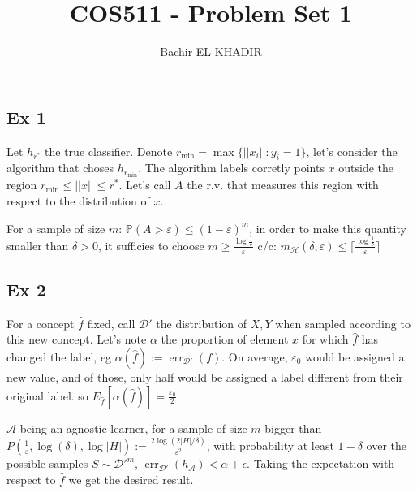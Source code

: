 \documentclass[12pt]{article}
\title{COS511 - Problem Set 1}
\author{Bachir EL KHADIR }
\newcommand{\Q}[1]{\subsection*{Ex #1}}
\newenvironment{question}[1]
{\Q{#1}}{}
\newcommand{\pr}{{\mathbb P}}
\DeclareMathOperator{\err}{err}
\begin{document}
\maketitle

\begin{question}{1}

Let $h_{r^*}$ the true classifier.
Denote $r_{\min} = \max \{ ||x_i|| : y_i = 1 \}$, let's consider the algorithm that choses $h_{r_{\min}}$.
The algorithm labels corretly points $x$ outside the region $r_{\min} \le ||x|| \le r^*$.
Let's call $A$ the r.v. that measures this region with respect to the distribution of $x$.

For a sample of size $m$: $\pr(A > \varepsilon) \le (1 - \varepsilon)^m$, in order to make this quantity smaller than $\delta > 0$, it sufficies to choose $m \ge \frac{\log \frac1\delta}{\varepsilon}
$
c/c: $m_{\mathcal H}(\delta, \varepsilon) \le \lceil \frac{\log \frac1\delta}{\varepsilon} \rceil$
\end{question}
\begin{question}{2}
For a concept $\hat f$ fixed, call $\mathcal D'$ the distribution of $X, Y$ when sampled according to this new concept. Let's note $\alpha$ the proportion of element $x$ for which $\hat f$ has changed the label, eg $\alpha(\hat f) := \err_{\mathcal D'}(f)$. On average, $\varepsilon_0$ would be assigned a new value, and of those, only half would be assigned a label different from their original label. so $E_{\hat f}[\alpha(\hat f)] = \frac{\varepsilon_0}2$

$\mathcal A$ being an agnostic learner, for a sample of size $m$ bigger than $P(\frac1\varepsilon, \log(\delta), \log|H|) := \frac{2 \log(2 |H| / \delta)}{\varepsilon^2}$, with probability at least $1 - \delta$ over the possible samples $S \sim \mathcal {D'}^m$, $\err_{\mathcal D'}(h_{\mathcal A}) < \alpha + \epsilon$.
Taking the expectation with respect to $\hat f$ we get the desired result.
\end{question}
\end{document}
